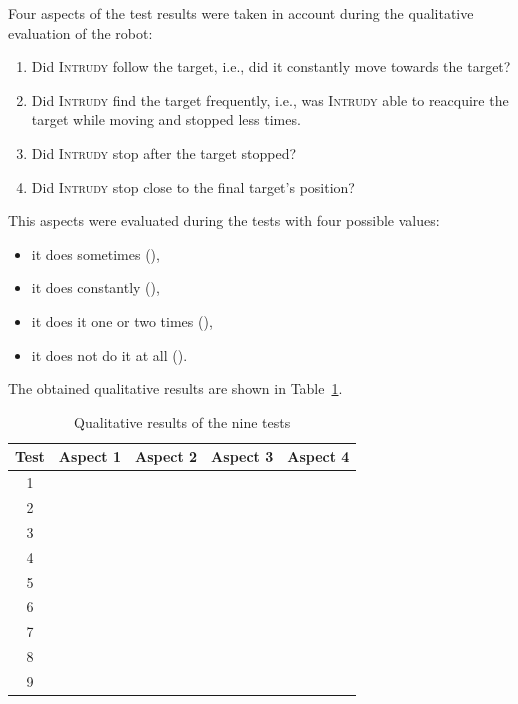 \documentclass[12pt,a4paper]{scrartcl}
\newcommand{\cmark}{\ding{51}}%
\newcommand{\xmark}{\ding{55}}%
\newcommand{\intrudy}{\textsc{Intrudy}\xspace}
\begin{document}
		Four aspects of the test results were taken in account during the
		qualitative evaluation of the robot: 
		\begin{enumerate}
			\item Did \intrudy follow the target, i.e., did it constantly move towards the target?
			\item Did \intrudy find the target frequently, i.e., was \intrudy able to reacquire the target while moving
			and stopped less times.
			\item Did \intrudy stop after the target stopped?
			\item Did \intrudy stop close to the final target's position?
		\end{enumerate}
		This aspects were evaluated during the tests with four possible values:
		\begin{itemize}
			\item it does sometimes (\cmark),
			\item it does constantly (\cmark\cmark),
			\item it does it one or two times (\xmark),
			\item it does not do it at all (\xmark\xmark).
		\end{itemize}
		
		The obtained qualitative results are shown in Table~\ref{tab:qualitative_results}.


		\begin{table}
			\center
			\begin{tabular}{|c|c|c|c|c|}
				\hline 
				Test & Aspect 1 & Aspect 2 & Aspect 3 & Aspect 4\tabularnewline
				\hline 
				\hline 
				1 & \cmark\cmark & \xmark & \cmark & \cmark\cmark\tabularnewline
				\hline 
				2 & \cmark\cmark & \cmark & \cmark & \cmark\cmark\tabularnewline
				\hline 
				3 & \cmark\cmark & \cmark\cmark & \xmark & \xmark\tabularnewline
				\hline 
				4 & \cmark & \xmark & \xmark\xmark & \xmark\xmark\tabularnewline
				\hline 
				5 & \cmark\cmark & \cmark & \xmark & \xmark\xmark\tabularnewline
				\hline 
				6 & \cmark\cmark & \cmark & \cmark\cmark & \cmark\tabularnewline
				\hline 
				7 & \cmark\cmark & \cmark & \cmark\cmark & \cmark\tabularnewline
				\hline 
				8 & \cmark\cmark & \cmark\cmark & \cmark\cmark & \cmark\cmark\tabularnewline
				\hline 
				9 & \cmark\cmark & \cmark & \xmark & \cmark\tabularnewline
				\hline 
			\end{tabular}
			\caption{Qualitative results of the nine tests}
			\label{tab:qualitative_results}
		\end{table}
\end{document}
